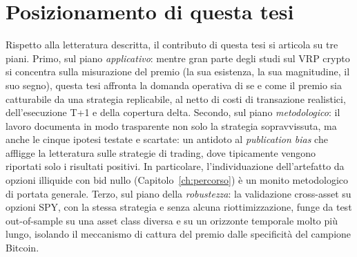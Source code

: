 \section{Posizionamento di questa tesi}
\label{sec:lit-posizionamento}

Rispetto alla letteratura descritta, il contributo di questa tesi si
articola su tre piani. Primo, sul piano \emph{applicativo}: mentre gran
parte degli studi sul VRP crypto si concentra sulla misurazione del premio
(la sua esistenza, la sua magnitudine, il suo segno), questa tesi affronta
la domanda operativa di se e come il premio sia catturabile da una
strategia replicabile, al netto di costi di transazione realistici,
dell'esecuzione T+1 e della copertura delta. Secondo, sul piano
\emph{metodologico}: il lavoro documenta in modo trasparente non solo la
strategia sopravvissuta, ma anche le cinque ipotesi testate e scartate:
un antidoto al \emph{publication bias} che affligge la letteratura sulle
strategie di trading, dove tipicamente vengono riportati solo i risultati
positivi. In particolare, l'individuazione dell'artefatto da opzioni
illiquide con bid nullo (Capitolo~\ref{ch:percorso}) è un monito
metodologico di portata generale. Terzo, sul piano della \emph{robustezza}:
la validazione cross-asset su opzioni SPY, con la stessa strategia e senza
alcuna riottimizzazione, funge da test out-of-sample su una asset class
diversa e su un orizzonte temporale molto più lungo, isolando il meccanismo
di cattura del premio dalle specificità del campione Bitcoin.
